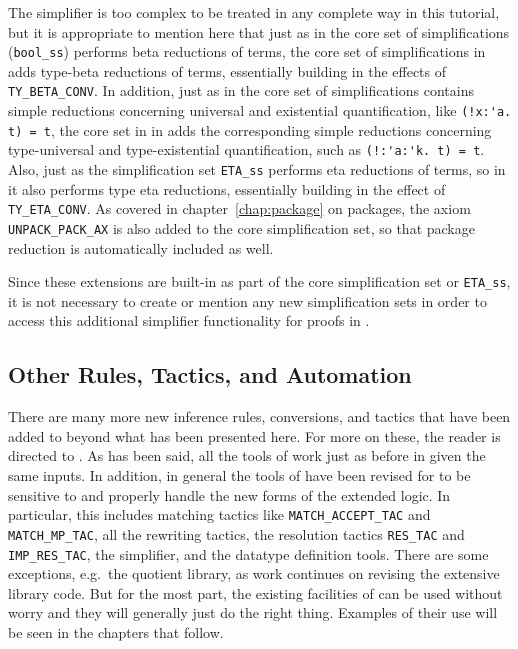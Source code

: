 The simplifier is too complex to be treated in any complete way in this
tutorial, but it is appropriate to mention here that just as in \HOL{}
the core set of simplifications (\texttt{bool\_ss})
performs beta reductions of
terms, the core set of simplifications in \HOLW{} adds type-beta
reductions of terms, essentially building in the effects of
\texttt{TY\_BETA\_CONV}.
In addition, just as in \HOL{} the core set of simplifications contains
simple reductions concerning universal and existential quantification,
like \verb+(!x:'a. t) = t+, the core set in in \HOLW{} adds the corresponding
simple reductions concerning type-universal and type-existential quantification,
such as \verb+(!:'a:'k. t) = t+.
Also, just as the \HOL{} simplification set \texttt{ETA\_ss} performs eta
reductions of terms, so in \HOLW{} it also performs type eta reductions,
essentially building in the effect of \texttt{TY\_ETA\_CONV}.
As covered in chapter~\ref{chap:package} on packages, 
the axiom {\tt UNPACK\_PACK\_AX} is also added to the 
core simplification set,
so that package reduction is automatically included as well.

Since these extensions are built-in as part of the core simplification set or
\texttt{ETA\_ss}, it is not necessary to create or mention any new
simplification sets in order to access this additional simplifier functionality
for proofs in \HOLW.


\subsection{Other Rules, Tactics, and Automation}

There are many more new inference rules, conversions, and tactics that
have been added to \HOLW{} beyond what has been presented here.
For more on these, the reader is directed to \DESCRIPTION.
As has been said, all the tools of \HOL{} work just as before in \HOLW{}
given the same inputs.  In addition,
in general the tools of \HOL{} have been revised for \HOLW{} to be
sensitive to and properly handle the new forms of the extended logic.
In particular, this includes matching tactics like
\texttt{MATCH\_ACCEPT\_TAC} and \texttt{MATCH\_MP\_TAC},
all the rewriting tactics, the resolution tactics
\texttt{RES\_TAC} and \texttt{IMP\_RES\_TAC},
the simplifier, and the datatype definition tools. 
There are some exceptions, e.g.\ the quotient library,
as work continues on revising the extensive \HOL{} library code.
But for the most part, the existing facilities of \HOL{} can be used without
worry and they will generally just do the right thing.  Examples of their use
will be seen in the chapters that follow.

